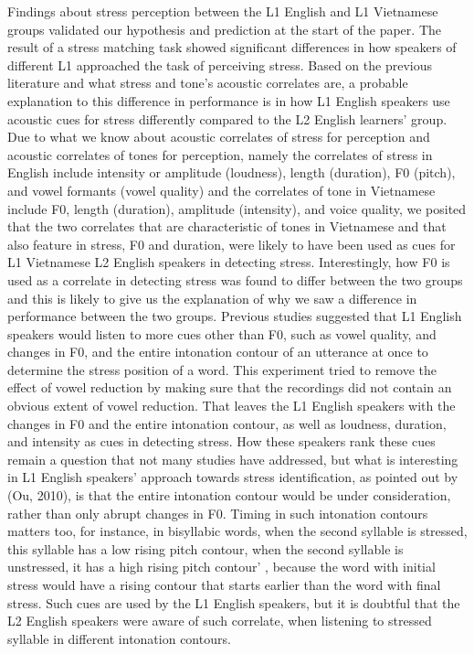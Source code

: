 \documentclass[a4paper]{article}
\begin{document}
Findings about stress perception between the L1 English and L1 Vietnamese groups validated our hypothesis and prediction at the start of the paper. The result of a stress matching task showed significant differences in how speakers of different L1 approached the task of perceiving stress. Based on the previous literature and what stress and tone's acoustic correlates are, a probable explanation to this difference in performance is in how L1 English speakers use acoustic cues for stress differently compared to the L2 English learners' group. Due to what we know about acoustic correlates of stress for perception and acoustic correlates of tones for perception, namely the correlates of stress in English include intensity or amplitude (loudness), length (duration), F0 (pitch), and vowel formants (vowel quality) and the correlates of tone in Vietnamese include F0, length (duration), amplitude (intensity), and voice quality, we posited that the two correlates that are characteristic of tones in Vietnamese and that also feature in stress, F0 and duration, were likely to have been used as cues for L1 Vietnamese L2 English speakers in detecting stress. Interestingly, how F0 is used as a correlate in detecting stress was found to differ between the two groups and this is likely to give us the explanation of why we saw a difference in performance between the two groups. Previous studies suggested that L1 English speakers would listen to more cues other than F0, such as vowel quality, and changes in F0, and the entire intonation contour of an utterance at once to determine the stress position of a word. This experiment tried to remove the effect of vowel reduction by making sure that the recordings did not contain an obvious extent of vowel reduction. That leaves the L1 English speakers with the changes in F0 and the entire intonation contour, as well as loudness, duration, and intensity as cues in detecting stress. How these speakers rank these cues remain a question that not many studies have addressed, but what is interesting in L1 English speakers' approach towards stress identification, as pointed out by (Ou, 2010), is that the entire intonation contour would be under consideration, rather than only abrupt changes in F0. Timing in such intonation contours matters too, for instance, in bisyllabic words, when the second syllable is stressed, this syllable has a low rising pitch contour, when the second syllable is unstressed, it has a high rising pitch contour' \cite{Ou:2010aa}, because the word with initial stress would have a rising contour that starts earlier than the word with final stress. Such cues are used by the L1 English speakers, but it is doubtful that the L2 English speakers were aware of such correlate, when listening to stressed syllable in different intonation contours.
\end{document}
